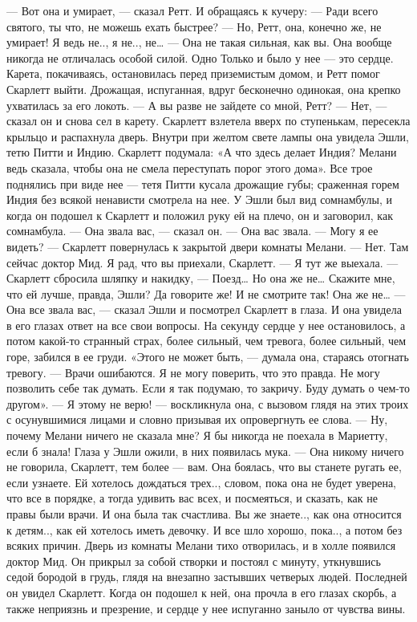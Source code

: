 — Вот она и умирает, — сказал Ретт. И обращаясь к кучеру: — Ради всего святого, ты что, не можешь ехать быстрее?
— Но, Ретт, она, конечно же, не умирает! Я ведь не.., я не.., не…
— Она не такая сильная, как вы. Она вообще никогда не отличалась особой силой. Одно Только и было у нее — это сердце.
Карета, покачиваясь, остановилась перед приземистым домом, и Ретт помог Скарлетт выйти. Дрожащая, испуганная, вдруг бесконечно одинокая, она крепко ухватилась за его локоть.
— А вы разве не зайдете со мной, Ретт?
— Нет, — сказал он и снова сел в карету.
Скарлетт взлетела вверх по ступенькам, пересекла крыльцо и распахнула дверь. Внутри при желтом свете лампы она увидела Эшли, тетю Питти и Индию. Скарлетт подумала: «А что здесь делает Индия? Мелани ведь сказала, чтобы она не смела переступать порог этого дома». Все трое поднялись при виде нее — тетя Питти кусала дрожащие губы; сраженная горем Индия без всякой ненависти смотрела на нее. У Эшли был вид сомнамбулы, и когда он подошел к Скарлетт и положил руку ей на плечо, он и заговорил, как сомнамбула.
— Она звала вас, — сказал он. — Она вас звала.
— Могу я ее видеть? — Скарлетт повернулась к закрытой двери комнаты Мелани.
— Нет. Там сейчас доктор Мид. Я рад, что вы приехали, Скарлетт.
— Я тут же выехала. — Скарлетт сбросила шляпку и накидку, — Поезд… Но она же не… Скажите мне, что ей лучше, правда, Эшли? Да говорите же! И не смотрите так! Она же не…
— Она все звала вас, — сказал Эшли и посмотрел Скарлетт в глаза.
И она увидела в его глазах ответ на все свои вопросы. На секунду сердце у нее остановилось, а потом какой-то странный страх, более сильный, чем тревога, более сильный, чем горе, забился в ее груди. «Этого не может быть, — думала она, стараясь отогнать тревогу. — Врачи ошибаются. Я не могу поверить, что это правда. Не могу позволить себе так думать. Если я так подумаю, то закричу. Буду думать о чем-то другом».
— Я этому не верю! — воскликнула она, с вызовом глядя на этих троих с осунувшимися лицами и словно призывая их опровергнуть ее слова. — Ну, почему Мелани ничего не сказала мне? Я бы никогда не поехала в Мариетту, если б знала!
Глаза у Эшли ожили, в них появилась мука.
— Она никому ничего не говорила, Скарлетт, тем более — вам. Она боялась, что вы станете ругать ее, если узнаете. Ей хотелось дождаться трех.., словом, пока она не будет уверена, что все в порядке, а тогда удивить вас всех, и посмеяться, и сказать, как не правы были врачи. И она была так счастлива. Вы же знаете.., как она относится к детям.., как ей хотелось иметь девочку. И все шло хорошо, пока.., а потом без всяких причин.
Дверь из комнаты Мелани тихо отворилась, и в холле появился доктор Мид. Он прикрыл за собой створки и постоял с минуту, уткнувшись седой бородой в грудь, глядя на внезапно застывших четверых людей. Последней он увидел Скарлетт. Когда он подошел к ней, она прочла в его глазах скорбь, а также неприязнь и презрение, и сердце у нее испуганно заныло от чувства вины.
